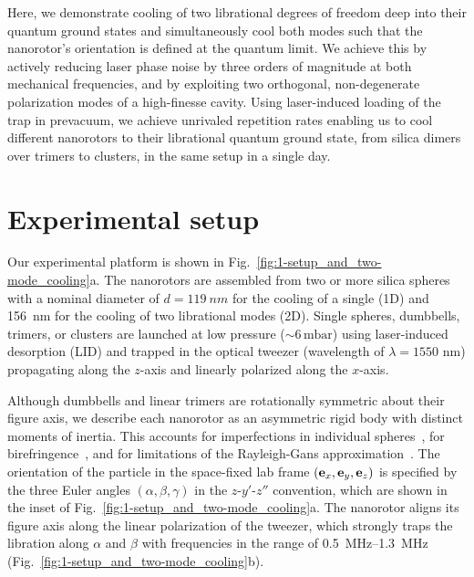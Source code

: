 \documentclass[reprint, amsmath, amssymb, superscriptaddress,showkeys,aps,pra]{revtex4-2}
\begin{document}
Here, we demonstrate cooling of two librational degrees of freedom deep into their quantum ground states and simultaneously cool both modes such that the nanorotor’s orientation is defined at the quantum limit. We achieve this by actively reducing laser phase noise by three orders of magnitude at both mechanical frequencies, and by exploiting two orthogonal, non-degenerate polarization modes of a high-finesse cavity. Using laser-induced loading of the trap in prevacuum, we achieve unrivaled repetition rates enabling us to cool different nanorotors to their librational quantum ground state, from silica dimers over trimers to clusters, in the same setup in a single day.

\section{Experimental setup}

Our experimental platform is shown in Fig.~\ref{fig:1-setup_and_two-mode_cooling}a. The nanorotors are assembled from two or more silica spheres with a nominal diameter of $d=\qty{119}{nm}$ for the cooling of a single (1D) and \qty{156}{nm} for the cooling of two librational modes (2D). Single spheres, dumbbells, trimers, or clusters are launched at low pressure ($\sim6\,\text{mbar}$) using laser-induced desorption (LID) and trapped in the optical tweezer (wavelength of $\lambda=1550$ nm) propagating along the $z$-axis and linearly polarized along the $x$-axis.  

Although dumbbells and linear trimers are rotationally symmetric about their figure axis, we describe each nanorotor as an asymmetric rigid body with distinct moments of inertia. This accounts for imperfections in individual spheres~\cite{rudolph_theory_2021}, for birefringence~\cite{arita_rotational_2016}, and for limitations of the Rayleigh-Gans approximation~\cite{stickler_rotranslational_2016}.
The orientation of the particle in the space-fixed lab frame $({\bf e}_x,{\bf e}_y, {\bf e}_z)$ is specified by the three Euler angles $(\alpha,\beta,\gamma)$ in the $z$-$y'$-$z''$ convention, which are shown in the inset of Fig.~\ref{fig:1-setup_and_two-mode_cooling}a. The nanorotor aligns its figure axis along the linear polarization of the tweezer, which strongly traps the libration along $\alpha$ and $\beta$ with frequencies in the range of \qtyrange{0.5}{1.3}{MHz} (Fig.~\ref{fig:1-setup_and_two-mode_cooling}b).
\end{document}
